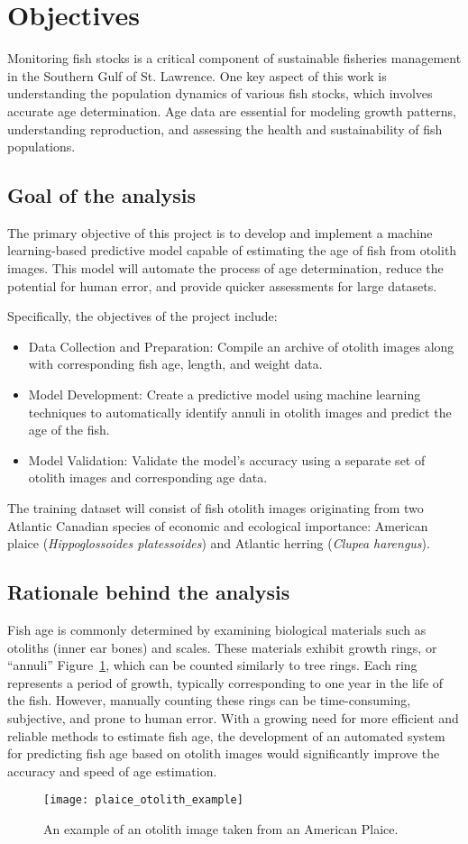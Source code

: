 \section{Objectives}

Monitoring fish stocks is a critical component of sustainable fisheries management in the Southern Gulf of St. Lawrence.
One key aspect of this work is understanding the population dynamics of various fish stocks, which involves accurate age determination.
Age data are essential for modeling growth patterns, understanding reproduction, and assessing the health and sustainability of fish populations.

\subsection{Goal of the analysis}

The primary objective of this project is to develop and implement a machine learning-based predictive model capable
of estimating the age of fish from otolith images.
This model will automate the process of age determination, reduce the potential for human error, and provide quicker assessments for large datasets.

Specifically, the objectives of the project include:


\begin{itemize}
    \item Data Collection and Preparation: Compile an archive of otolith images along with corresponding fish age, length, and weight data.
    \item Model Development: Create a predictive model using machine learning techniques to automatically identify annuli in otolith images and predict the age of the fish.
    \item Model Validation: Validate the model's accuracy using a separate set of otolith images and corresponding age data.
\end{itemize}

The training dataset will consist of fish otolith images originating from two
Atlantic Canadian species of economic and ecological importance: American plaice (\textit{Hippoglossoides platessoides}) and
Atlantic herring (\textit{Clupea harengus}).


\subsection{Rationale behind the analysis}

Fish age is commonly determined by examining biological materials such as otoliths (inner ear bones) and scales.
These materials exhibit growth rings, or \enquote{annuli} Figure~\ref{fig:plaice_oto_example}, which can be counted similarly to tree rings.
Each ring represents a period of growth, typically corresponding to one year in the life of the fish.
However, manually counting these rings can be time-consuming, subjective, and prone to human error.
With a growing need for more efficient and reliable methods to estimate fish age, the development of an automated system for predicting
fish age based on otolith images would significantly improve the accuracy and speed of age estimation.


\begin{figure}
    \texttt{[image: plaice\_otolith\_example]}
    \caption{An example of an otolith image taken from an American Plaice.}
    \label{fig:plaice_oto_example}
\end{figure}